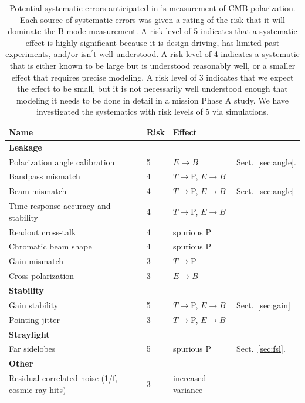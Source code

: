 \documentclass[PICOReport.tex]{subfiles}
\begin{document}
\begin{table}[h!]
\hspace{-0.1in}
\parbox{3.5in}{
\centering
\scriptsize
 \begin{tabular}{p{3.3cm} p{0.5cm} p{1.4cm} p{1.7cm}}
 \hline
\textbf{Name} & \textbf{Risk}&\textbf{Effect} \\
 \hline
\textbf{Leakage}& &\\
Polarization angle calibration\dotfill& 
5&
$E{\to}B$ &
Sect.~\ref{sec:angle}.
\\
 Bandpass mismatch\dotfill&
 4& 
$T{\to}$P, $E{\to}B$  
   \\
Beam mismatch\dotfill& 
4&
$T{\to}$P, $E{\to}B$
& Sect.~\ref{sec:angle}
\\
Time response accuracy and stability\dotfill&
4&
$T{\to}$P, $E{\to}B$
\\
Readout cross-talk\dotfill& 
4&
spurious P
\\
Chromatic beam shape\dotfill&
4&
spurious P
\\

Gain mismatch\dotfill&
3&
$T{\to}$P   
\\


Cross-polarization\dotfill&
3&
$E{\to}B$
\\
\hline 
\textbf{Stability} & & \\
Gain stability\dotfill& 
5&
$T{\to}$P, $E{\to} B$
& 
Sect.~\ref{sec:gain}
\\
Pointing jitter\dotfill&
3&
$T{\to}$P, $E{\to}B$
\\

\hline
\textbf{Straylight}& & \\
Far sidelobes\dotfill& 
5&
spurious P
&
Sect.~\ref{sec:fsl}.\\
 \hline
\textbf{Other} \\
Residual correlated noise (1/f, cosmic ray hits)\dotfill&
3 &
increased variance
\\
\hline
 \end{tabular}
}
\hspace{-0.0in}
\parbox{3.1in}{
\caption{\captiontext
Potential systematic errors anticipated in \pico's measurement of CMB polarization. Each source of systematic errors was given a rating of the risk that it will dominate the B-mode measurement.  A risk level of 5 indicates that a systematic effect is highly significant because it is design-driving, has limited past experiments, and/or isn$^\prime$t well understood.  A risk level of 4 indicates a systematic that is either known to be large but is understood reasonably well, or a smaller effect that requires precise modeling.  A risk level of 3 indicates that we expect the effect to be small, but it is not necessarily well understood enough that modeling it needs to be done in detail in a mission Phase A study. We have investigated the systematics with risk levels of 5 via simulations.
\label{tbl:SystematicsList2col} }}
\hspace{-0.0in}
\end{table}
\end{document}
